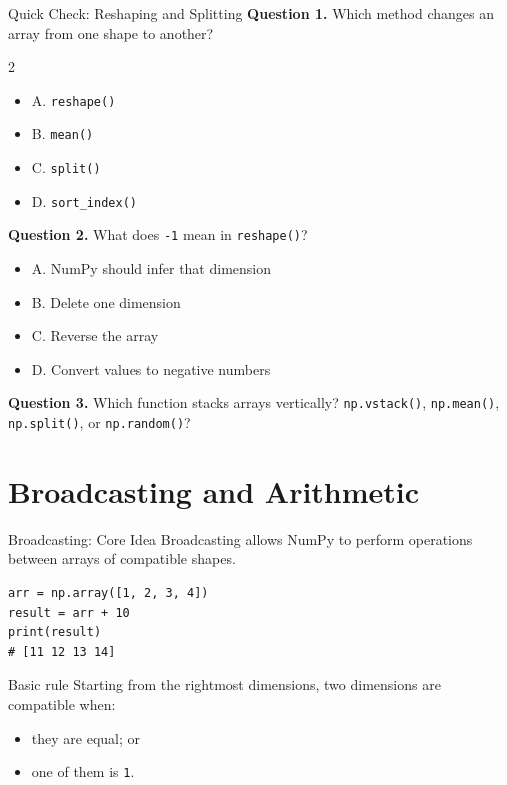 \documentclass[aspectratio=169,11pt]{beamer}
\newcommand{\quiztitle}[1]{\textbf{\textcolor{QuizOrange}{#1}}}
\begin{document}
\begin{frame}{Quick Check: Reshaping and Splitting}
\small
\quiztitle{Question 1.} Which method changes an array from one shape to another?
\begin{multicols}{2}
\begin{itemize}
  \item A. \texttt{reshape()}
  \item B. \texttt{mean()}
  \item C. \texttt{split()}
  \item D. \texttt{sort\_index()}
\end{itemize}
\end{multicols}
\quiztitle{Question 2.} What does \texttt{-1} mean in \texttt{reshape()}?
\begin{itemize}
  \item A. NumPy should infer that dimension
  \item B. Delete one dimension
  \item C. Reverse the array
  \item D. Convert values to negative numbers
\end{itemize}
\quiztitle{Question 3.} Which function stacks arrays vertically? \texttt{np.vstack()}, \texttt{np.mean()}, \texttt{np.split()}, or \texttt{np.random()}?
\end{frame}

\section{Broadcasting and Arithmetic}

\begin{frame}[fragile]{Broadcasting: Core Idea}
\small
Broadcasting allows NumPy to perform operations between arrays of compatible shapes.
\begin{lstlisting}[style=py]
arr = np.array([1, 2, 3, 4])
result = arr + 10
print(result)
# [11 12 13 14]
\end{lstlisting}
\begin{block}{Basic rule}
Starting from the rightmost dimensions, two dimensions are compatible when:
\begin{itemize}
  \item they are equal; or
  \item one of them is \texttt{1}.
\end{itemize}
\end{block}
\end{frame}
\end{document}
